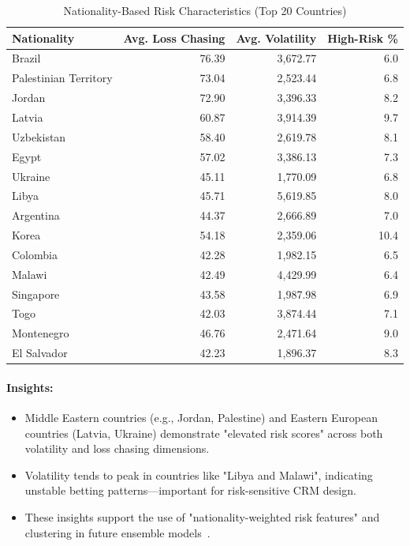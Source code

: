 \documentclass[12pt,a4paper]{report}
\begin{document}
\begin{table}[H]
\centering
\caption{Nationality-Based Risk Characteristics (Top 20 Countries)}
\label{tab:nationality_risk_matrix}
\begin{tabular}{lrrr}
\toprule
\textbf{Nationality} & \textbf{Avg. Loss Chasing} & \textbf{Avg. Volatility} & \textbf{High-Risk \%} \\
\midrule
Brazil & 76.39 & 3,672.77 & 6.0 \\
Palestinian Territory & 73.04 & 2,523.44 & 6.8 \\
Jordan & 72.90 & 3,396.33 & 8.2 \\
Latvia & 60.87 & 3,914.39 & 9.7 \\
Uzbekistan & 58.40 & 2,619.78 & 8.1 \\
Egypt & 57.02 & 3,386.13 & 7.3 \\
Ukraine & 45.11 & 1,770.09 & 6.8 \\
Libya & 45.71 & 5,619.85 & 8.0 \\
Argentina & 44.37 & 2,666.89 & 7.0 \\
Korea & 54.18 & 2,359.06 & 10.4 \\
Colombia & 42.28 & 1,982.15 & 6.5 \\
Malawi & 42.49 & 4,429.99 & 6.4 \\
Singapore & 43.58 & 1,987.98 & 6.9 \\
Togo & 42.03 & 3,874.44 & 7.1 \\
Montenegro & 46.76 & 2,471.64 & 9.0 \\
El Salvador & 42.23 & 1,896.37 & 8.3 \\
\bottomrule
\end{tabular}
\end{table}

\paragraph{Insights:}
\begin{itemize}
    \item Middle Eastern countries (e.g., Jordan, Palestine) and Eastern European countries (Latvia, Ukraine) demonstrate "elevated risk scores" across both volatility and loss chasing dimensions.
    \item Volatility tends to peak in countries like "Libya and Malawi", indicating unstable betting patterns—important for risk-sensitive CRM design.
    \item These insights support the use of "nationality-weighted risk features" and clustering in future ensemble models~\citep{ghaharian2022b}.
\end{itemize}
\end{document}
